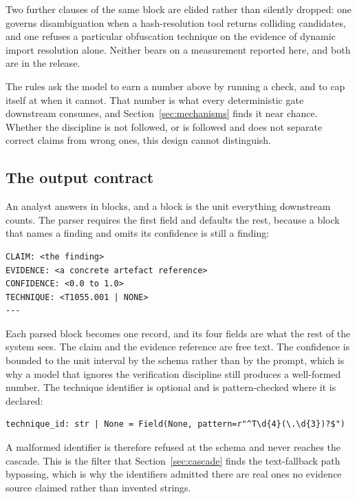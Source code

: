 Two further clauses of the same block are elided rather than silently dropped: one governs
disambiguation when a hash-resolution tool returns colliding candidates, and one refuses a
particular obfuscation technique on the evidence of dynamic import resolution alone. Neither
bears on a measurement reported here, and both are in the release.

The rules ask the model to earn a number above  by running a check, and to cap itself
at  when it cannot. That number is what every deterministic gate downstream consumes,
and Section~\ref{sec:mechanisms} finds it near chance. Whether the discipline is not followed, or is
followed and does not separate correct claims from wrong ones, this design cannot distinguish.

\subsection{The output contract}\label{prompt-schema}

An analyst answers in blocks, and a block is the unit everything downstream counts. The parser
requires the first field and defaults the rest, because a block that names a finding and omits
its confidence is still a finding:

\begin{verbatim}
CLAIM: <the finding>
EVIDENCE: <a concrete artefact reference>
CONFIDENCE: <0.0 to 1.0>
TECHNIQUE: <T1055.001 | NONE>
---
\end{verbatim}

Each parsed block becomes one record, and its four fields are what the rest of the system sees.
The claim and the evidence reference are free text. The confidence is bounded to the unit
interval by the schema rather than by the prompt, which is why a model that ignores the
verification discipline still produces a well-formed number. The technique identifier is optional
and is pattern-checked where it is declared:

\begin{verbatim}
technique_id: str | None = Field(None, pattern=r"^T\d{4}(\.\d{3})?$")
\end{verbatim}

A malformed identifier is therefore refused at the schema and never reaches the cascade. This is
the filter that Section~\ref{sec:cascade} finds the text-fallback path bypassing, which is why
the identifiers admitted there are real ones no evidence source claimed rather than invented
strings.

